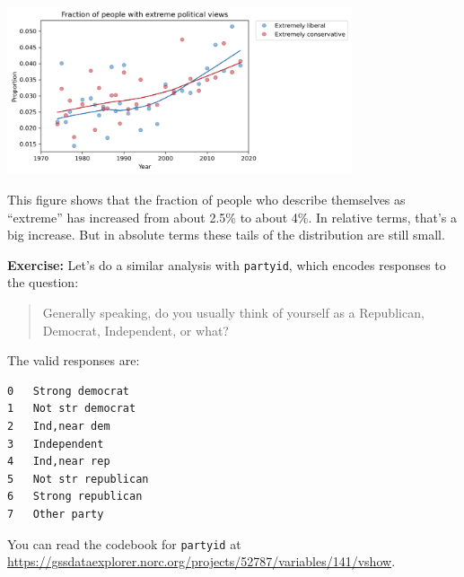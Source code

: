 \begin{center}
\includegraphics[width=4in]{chapters/02_polviews_soln_files/02_polviews_soln_93_0.png}
\end{center}

This figure shows that the fraction of people who describe themselves as
``extreme'' has increased from about 2.5\% to about 4\%. In relative
terms, that's a big increase. But in absolute terms these tails of the
distribution are still small.

\textbf{Exercise:} Let's do a similar analysis with
\passthrough{\lstinline!partyid!}, which encodes responses to the
question:

\begin{quote}
Generally speaking, do you usually think of yourself as a Republican,
Democrat, Independent, or what?
\end{quote}

The valid responses are:

\begin{lstlisting}
0   Strong democrat
1   Not str democrat
2   Ind,near dem
3   Independent
4   Ind,near rep
5   Not str republican
6   Strong republican
7   Other party
\end{lstlisting}

You can read the codebook for \passthrough{\lstinline!partyid!} at
\url{https://gssdataexplorer.norc.org/projects/52787/variables/141/vshow}.

